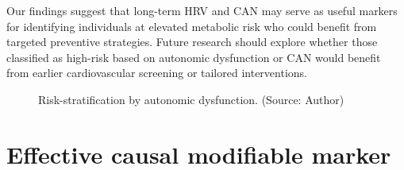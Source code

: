 \documentclass[
  a4paper,
  headsepline=true,
  open=any]{scrbook}
\begin{document}
Our findings suggest that long-term HRV and CAN may serve as useful
markers for identifying individuals at elevated metabolic risk who could
benefit from targeted preventive strategies. Future research should
explore whether those classified as high-risk based on autonomic
dysfunction or CAN would benefit from earlier cardiovascular screening
or tailored interventions.

\begin{figure}

\begin{minipage}[t]{\linewidth}

{\centering 


\caption{Risk-stratification by autonomic dysfunction. (Source: Author)}

}

\end{minipage}%

\end{figure}

\hypertarget{effective-causal-modifiable-marker}{%
\section{Effective causal modifiable
marker}\label{effective-causal-modifiable-marker}}
\end{document}
